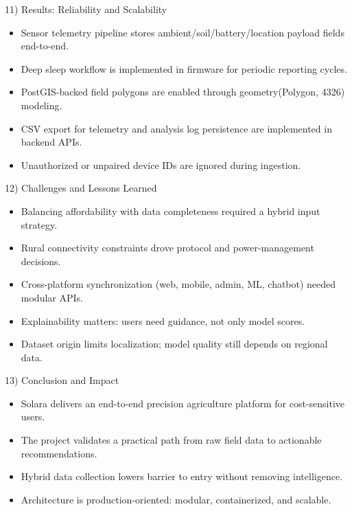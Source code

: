 \documentclass[aspectratio=169]{beamer}
\begin{document}
\begin{frame}{11) Results: Reliability and Scalability}
  \begin{itemize}
    \item Sensor telemetry pipeline stores ambient/soil/battery/location payload fields end-to-end.
    \item Deep sleep workflow is implemented in firmware for periodic reporting cycles.
    \item PostGIS-backed field polygons are enabled through geometry(Polygon, 4326) modeling.
    \item CSV export for telemetry and analysis log persistence are implemented in backend APIs.
    \item Unauthorized or unpaired device IDs are ignored during ingestion.
  \end{itemize}
\end{frame}

\begin{frame}{12) Challenges and Lessons Learned}
  \begin{itemize}
    \item Balancing affordability with data completeness required a hybrid input strategy.
    \item Rural connectivity constraints drove protocol and power-management decisions.
    \item Cross-platform synchronization (web, mobile, admin, ML, chatbot) needed modular APIs.
    \item Explainability matters: users need guidance, not only model scores.
    \item Dataset origin limits localization; model quality still depends on regional data.
  \end{itemize}
\end{frame}

\begin{frame}{13) Conclusion and Impact}
  \begin{itemize}
    \item Solara delivers an end-to-end precision agriculture platform for cost-sensitive users.
    \item The project validates a practical path from raw field data to actionable recommendations.
    \item Hybrid data collection lowers barrier to entry without removing intelligence.
    \item Architecture is production-oriented: modular, containerized, and scalable.
  \end{itemize}
\end{frame}
\end{document}
